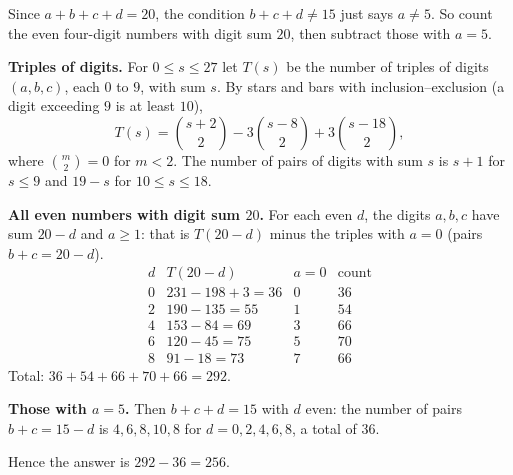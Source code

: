 Since $a+b+c+d=20$, the condition $b+c+d\ne15$ just says $a\ne5$. So count the even four-digit numbers with digit sum $20$, then subtract those with $a=5$.

\textbf{Triples of digits.} For $0\le s\le 27$ let $T(s)$ be the number of triples of digits $(a,b,c)$, each $0$ to $9$, with sum $s$. By stars and bars with inclusion--exclusion (a digit exceeding $9$ is at least $10$),
\[
T(s)=\binom{s+2}{2}-3\binom{s-8}{2}+3\binom{s-18}{2},
\]
where $\binom m2=0$ for $m<2$. The number of pairs of digits with sum $s$ is $s+1$ for $s\le9$ and $19-s$ for $10\le s\le18$.

\textbf{All even numbers with digit sum $20$.} For each even $d$, the digits $a,b,c$ have sum $20-d$ and $a\ge1$: that is $T(20-d)$ minus the triples with $a=0$ (pairs $b+c=20-d$).
\[
\begin{array}{c|c|c|c}
d & T(20-d) & a=0 & \text{count}\\\hline
0 & 231-198+3=36 & 0 & 36\\
2 & 190-135=55 & 1 & 54\\
4 & 153-84=69 & 3 & 66\\
6 & 120-45=75 & 5 & 70\\
8 & 91-18=73 & 7 & 66
\end{array}
\]
Total: $36+54+66+70+66=292$.

\textbf{Those with $a=5$.} Then $b+c+d=15$ with $d$ even: the number of pairs $b+c=15-d$ is $4,6,8,10,8$ for $d=0,2,4,6,8$, a total of $36$.

Hence the answer is $292-36=\boxed{256}$.
